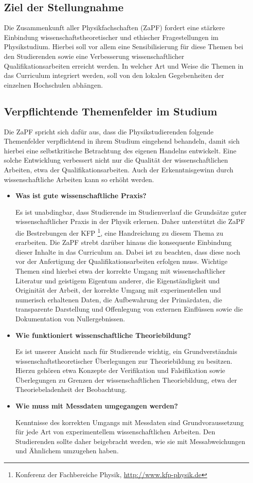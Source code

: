 \subsection*{Ziel der Stellungnahme}
Die Zusammenkunft aller Physikfachschaften (ZaPF) fordert eine stärkere Einbindung wissenschaftstheoretischer und ethischer Fragestellungen im Physikstudium. Hierbei soll vor allem eine Sensibilisierung für diese Themen bei den Studierenden sowie eine Verbesserung wissenschaftlicher Qualifikationsarbeiten erreicht werden. In welcher Art und Weise die Themen in das Curriculum integriert werden, soll von den lokalen Gegebenheiten der einzelnen Hochschulen abhängen.

\subsection*{Verpflichtende Themenfelder im Studium}
Die ZaPF spricht sich dafür aus, dass die Physikstudierenden folgende Themenfelder verpflichtend in ihrem Studium eingehend behandeln, damit sich hierbei eine selbstkritische Betrachtung des eigenen Handelns entwickelt. Eine solche Entwicklung verbessert nicht nur die Qualität der wissenschaftlichen Arbeiten, etwa der Qualifikationsarbeiten. Auch der Erkenntnisgewinn durch wissenschaftliche Arbeiten kann so erhöht werden.
\begin{itemize}
\item\textbf{Was ist gute wissenschaftliche Praxis?}
    \par Es ist unabdingbar, dass Studierende im Studienverlauf die Grundsätze guter wissenschaftlicher Praxis in der Physik  erlernen. Daher unterstützt die ZaPF die Bestrebungen der KFP \footnote{Konferenz der Fachbereiche Physik, \url{http://www.kfp-physik.de}}, eine  Handreichung zu diesem Thema zu erarbeiten. Die ZaPF strebt darüber  hinaus die konsequente Einbindung dieser Inhalte in das Curriculum an. Dabei ist zu beachten, dass diese noch vor der Anfertigung der  Qualifikationsarbeiten erfolgen muss. Wichtige Themen sind hierbei etwa der korrekte Umgang mit wissenschaftlicher Literatur und geistigem Eigentum anderer, die Eigenständigkeit und Originität der Arbeit, der korrekte Umgang mit experimentellen und numerisch erhaltenen Daten, die Aufbewahrung der Primärdaten, die transparente Darstellung und Offenlegung von externen Einflüssen sowie die Dokumentation von Nullergebnissen.
\item\textbf{Wie funktioniert wissenschaftliche Theoriebildung?}
    \par Es ist unserer Ansicht nach für Studierende wichtig, ein Grundverständnis wissenschaftstheoretischer Überlegungen zur Theoriebildung zu besitzen. Hierzu gehören etwa Konzepte der Verifikation und Falsifikation sowie Überlegungen zu Grenzen der wissenschaftlichen Theoriebildung, etwa der Theoriebeladenheit der Beobachtung.
\item\textbf{Wie muss mit Messdaten umgegangen werden?}
    \par Kenntnisse des korrekten Umgangs mit Messdaten sind Grundvoraussetzung für jede Art von experimentellem wissenschaftlichen Arbeiten. Den Studierenden sollte daher beigebracht werden, wie sie mit Messabweichungen und Ähnlichem umzugehen haben.
    \end{itemize}

